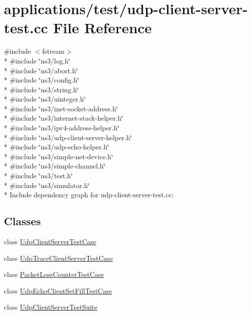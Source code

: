 \hypertarget{udp-client-server-test_8cc}{}\section{applications/test/udp-\/client-\/server-\/test.cc File Reference}
\label{udp-client-server-test_8cc}
{\ttfamily \#include $<$fstream$>$}\\*
{\ttfamily \#include \char`\"{}ns3/log.\+h\char`\"{}}\\*
{\ttfamily \#include \char`\"{}ns3/abort.\+h\char`\"{}}\\*
{\ttfamily \#include \char`\"{}ns3/config.\+h\char`\"{}}\\*
{\ttfamily \#include \char`\"{}ns3/string.\+h\char`\"{}}\\*
{\ttfamily \#include \char`\"{}ns3/uinteger.\+h\char`\"{}}\\*
{\ttfamily \#include \char`\"{}ns3/inet-\/socket-\/address.\+h\char`\"{}}\\*
{\ttfamily \#include \char`\"{}ns3/internet-\/stack-\/helper.\+h\char`\"{}}\\*
{\ttfamily \#include \char`\"{}ns3/ipv4-\/address-\/helper.\+h\char`\"{}}\\*
{\ttfamily \#include \char`\"{}ns3/udp-\/client-\/server-\/helper.\+h\char`\"{}}\\*
{\ttfamily \#include \char`\"{}ns3/udp-\/echo-\/helper.\+h\char`\"{}}\\*
{\ttfamily \#include \char`\"{}ns3/simple-\/net-\/device.\+h\char`\"{}}\\*
{\ttfamily \#include \char`\"{}ns3/simple-\/channel.\+h\char`\"{}}\\*
{\ttfamily \#include \char`\"{}ns3/test.\+h\char`\"{}}\\*
{\ttfamily \#include \char`\"{}ns3/simulator.\+h\char`\"{}}\\*
Include dependency graph for udp-\/client-\/server-\/test.cc\+:
\subsection*{Classes}
\begin{DoxyCompactItemize}
\item 
class \hyperlink{classUdpClientServerTestCase}{Udp\+Client\+Server\+Test\+Case}
\item 
class \hyperlink{classUdpTraceClientServerTestCase}{Udp\+Trace\+Client\+Server\+Test\+Case}
\item 
class \hyperlink{classPacketLossCounterTestCase}{Packet\+Loss\+Counter\+Test\+Case}
\item 
class \hyperlink{classUdpEchoClientSetFillTestCase}{Udp\+Echo\+Client\+Set\+Fill\+Test\+Case}
\item 
class \hyperlink{classUdpClientServerTestSuite}{Udp\+Client\+Server\+Test\+Suite}
\end{DoxyCompactItemize}
